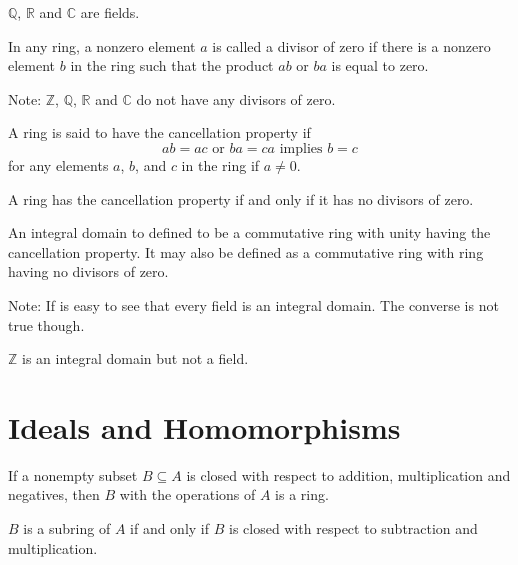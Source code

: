 \documentclass[12pt]{article}
\newcommand{\integers}{\mathds{Z}}
\newcommand{\rationals}{\mathds{Q}}
\newcommand{\reals}{\mathds{R}}
\newcommand{\complex}{\mathds{C}}
\begin{document}
\begin{example} $\rationals$, $\reals$ and $\complex$ are fields. \end{example} 

\begin{definition} In any ring, a nonzero element $a$ is called a divisor of zero if there is a nonzero element $b$ in the ring such that the product $ab$ or $ba$ is equal to zero. \end{definition} 

Note: $\integers$, $\rationals$, $\reals$ and $\complex$ do not have any divisors of zero. 

\begin{definition} A ring is said to have the cancellation property if $$ab = ac \text{ or } ba = ca \text{ implies } b = c $$ for any elements $a$, $b$, and $c$ in the ring if $a \neq 0$. \end{definition} 

\begin{theorem} A ring has the cancellation property if and only if it has no divisors of zero. \end{theorem} 

\begin{definition} An integral domain to defined to be a commutative ring with unity having the cancellation property. It may also be defined as a commutative ring with ring having no divisors of zero. \end{definition} 

Note: If is easy to see that every field is an integral domain. The converse is not true though. 

\begin{example} $\integers$ is an integral domain but not a field. \end{example} 

\section{Ideals and Homomorphisms}

\begin{definition} If a nonempty subset $B \subseteq A$ is closed with respect to addition, multiplication and negatives, then $B$ with the operations of $A$ is a ring. \end{definition} 

\begin{definition} $B$ is a subring of $A$ if and only if $B$ is closed with respect to subtraction and multiplication. \end{definition} 
\end{document}
